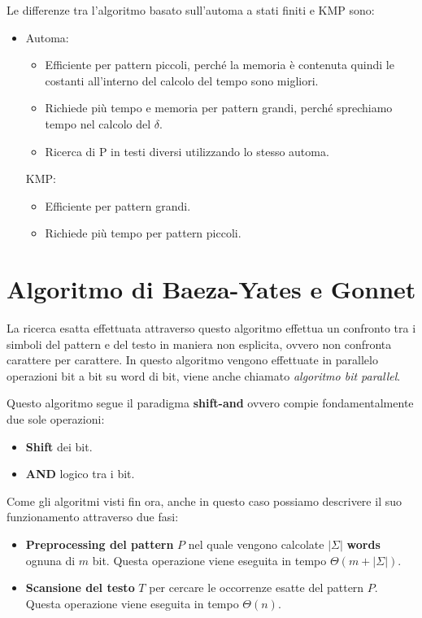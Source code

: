 Le differenze tra l'algoritmo basato sull'automa a stati finiti e KMP sono:
\begin{itemize}
    \item Automa:
          \begin{itemize}
              \item Efficiente per pattern piccoli, perché la memoria è contenuta
                    quindi le costanti all'interno del calcolo del tempo sono
                    migliori.
              \item Richiede più tempo e memoria per pattern grandi, perché
                    sprechiamo tempo nel calcolo del $\delta$.
              \item Ricerca di P in testi diversi utilizzando lo stesso automa.
          \end{itemize}
          KMP:
          \begin{itemize}
              \item Efficiente per pattern grandi.
              \item Richiede più tempo per pattern piccoli.
          \end{itemize}
\end{itemize}
\section{Algoritmo di Baeza-Yates e Gonnet}
La ricerca esatta effettuata attraverso questo algoritmo effettua un confronto
tra i simboli del pattern e del testo in maniera non esplicita, ovvero non
confronta carattere per carattere. In questo algoritmo vengono effettuate in
parallelo operazioni bit a bit su word di bit, viene anche chiamato
\textit{algoritmo bit parallel}.

Questo algoritmo segue il paradigma \textbf{shift-and} ovvero compie fondamentalmente
due sole operazioni:
\begin{itemize}
    \item \textbf{Shift} dei bit.
    \item \textbf{AND} logico tra i bit.
\end{itemize}
Come gli algoritmi visti fin ora, anche in questo caso possiamo descrivere il suo
funzionamento attraverso due fasi:
\begin{itemize}
    \item \textbf{Preprocessing del pattern} $P$ nel quale vengono calcolate
          $|\Sigma|$ \textbf{words} ognuna di $m$ bit. Questa operazione viene
          eseguita in tempo $\Theta(m + |\Sigma|)$.
    \item \textbf{Scansione del testo} $T$ per cercare le occorrenze esatte del
          pattern $P$. Questa operazione viene eseguita in tempo $\Theta(n)$.
\end{itemize}
